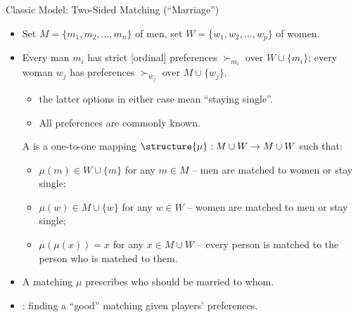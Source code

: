\documentclass[english,10pt
,aspectratio=169
]{beamer}
\begin{document}
\begin{frame}{Classic Model: Two-Sided Matching (``Marriage'')}
\begin{itemize}
	\item Set $M = \{m_1, m_2, ..., m_n\}$ of men, set $W = \{w_1, w_2, ..., w_p\}$ of women.
	\item Every man $m_i$ has strict [ordinal] preferences $\succ_{m_i}$ over $W \cup \{m_i\}$; every woman $w_j$ has preferences $\succ_{w_j}$ over $M \cup \{w_j\}$.
	\begin{itemize}
		\item the latter options in either case mean ``staying single''.
		\item All preferences are \alert{commonly known}.
	\end{itemize}
	\begin{definition}
		A  is a one-to-one mapping $\structure{\mu}: M \cup W \to M \cup W$ such that:
		\begin{itemize}
			\item $\mu(m) \in W \cup \{m\}$ for any $m \in M$ -- men are matched to women or stay single;
			\item $\mu(w) \in M \cup \{w\}$ for any $w \in W$ -- women are matched to men or stay single;
			\item $\mu(\mu(x)) = x$ for any $x \in M \cup W$ -- every person is matched to the person who is matched to them.
		\end{itemize}
	\end{definition}
	\item A matching $\mu$ prescribes who should be married to whom.
	\item {}: finding a ``good'' matching given players' preferences.
\end{itemize}
\end{frame}
\end{document}
